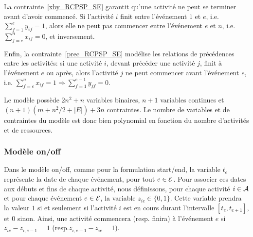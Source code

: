 La contrainte~\eqref{xby_RCPSP_SE} garantit qu'une activité ne peut se
terminer avant d'avoir commencé. Si l'activité $i$ finit entre
l'événement $1$ et $e$, i.e. $\sum_{f=1}^{e} y_{if}=1$, alors elle ne
peut pas commencer entre l'événement $e$ et $n$, i.e. $\sum_{f=e}^{n}
x_{if}=0$, et inversement.

Enfin, la contrainte~\eqref{prec_RCPSP_SE} modélise les relations
de précédences entre les activités: si une activité $i$, devant
précéder une activité $j$, finit à l'événement $e$ ou après, alors
l'activité $j$ ne peut commencer avant l'événement $e$, i.e.
$\sum_{f=e}^n x_{if}=1 \Rightarrow \sum_{f=1}^{e-1} y_{jf}=0$.

Le modèle possède $2n^2+n$ variables binaires, $n+1$ variables
continues et $(n+1)(m+n^2/2+|E|)+3n$ contraintes. Le nombre de
variables et de contraintes du modèle est donc bien polynomial en
fonction du nombre d'activités et de ressources.
 
\subsubsection{Modèle on/off} 

Dans le modèle on/off, comme pour la
formulation start/end, la variable $t_e$ représente la date
de chaque événement, pour tout $e \in {\cal E}$. Pour associer ces
dates aux débuts et fins de chaque activité, nous définissons, pour
chaque activité $i \in {\cal A}$ et pour chaque événement $e \in {\cal E}$, la
variable $z_{ie} \in \{0,1\}$. Cette variable prendra la valeur
$1$ si et seulement si l'activité $i$ est en cours durant
l'intervalle $[t_e,t_{e+1}]$, et 0 sinon. Ainsi, une activité
commencera (resp. finira) à l'événement $e$ si
$z_{ie}-z_{i,e-1}=1$ (resp.$z_{i,e-1}-z_{ie}=1$).

